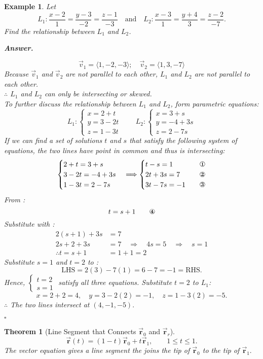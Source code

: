 \documentclass[12pt,a4paper]{article}
\newtheorem{thm}{Theorem}[subsection]
\newtheorem{eg}{Example}[subsection]
\newenvironment*{ans}{\par\indent\textbf{\textit{Answer. }}\par}{\par\hfill{$\square$}\par}
\def\vecv{\vec{v}}
\def\vecr{\vec{\boldsymbol{\textbf{r}}}}
\begin{document}
\begin{eg}
	Let \[L_1: \frac{x-2}{1}=\frac{y-3}{-2}=\frac{z-1}{-3}\quad\text{and}\quad L_2: \frac{x-3}{1}=\frac{y+4}{3}=\frac{z-2}{-7}.\] Find the relationship between $L_1$ and $L_2$.
	\begin{ans}
		\[\vecv_1=\langle1,-2,-3\rangle;\quad\vecv_2=\langle1,3,-7\rangle\]	 Because $\vecv_1$ and $\vecv_2$ are not parallel to each other, $L_1$ and $L_2$ are not parallel to each other. \\
		$\therefore$ $L_1$ and $L_2$ can only be intersecting or skewed. \\ 
		To further discuss the relationship between $L_1$ and $L_2$, form parametric equations: 
		\[L_1: \begin{cases}x=2+t\\y=3-2t\\z=1-3t\end{cases}\qquad L_2: \begin{cases}x=3+s\\y=-4+3s\\z=2-7s\end{cases}\]
		If we can find a set of solutions $t$ and $s$ that satisfy the following system of equations, the two lines have point in common and thus is intersecting: \[\begin{cases}2+t=3+s\\3-2t=-4+3s\\1-3t=2-7s\end{cases}\Longrightarrow\begin{cases}t-s=1\quad&\text{\ding{172}}\\2t+3s=7\quad&\text{\ding{173}}\\3t-7s=-1\quad&\text{\ding{174}}\end{cases}\]
		From : \[t=s+1\qquad\text{\ding{175}}\]
		Substitute  with : $$\begin{aligned}
			2(s+1)+3s&=7\\
			2s+2+3s&=7\quad\Rightarrow\quad4s=5\quad\Rightarrow\quad s=1\\
			\therefore t=s+1&=1+1=2
		\end{aligned}$$
		Substitute $s=1$ and $t=2$ to : \[\text{LHS}=2(3)-7(1)=6-7=-1=\text{RHS}.\]
		Hence, $\begin{cases}t=2\\s=1\end{cases}$ satisfy all three equations. Substitute $t=2$ to $L_1$: \[x=2+2=4,\quad y=3-2(2)=-1,\quad z=1-3(2)=-5.\]
		$\therefore$ The two lines intersect at $(4,-1,-5).$
	\end{ans}
\end{eg}
\begin{thm}[Line Segment that Connects $\vecr_0$ and $\vecr_r$]
\[\vecr(t)=(1-t)\vecr_0+t\vecr_1,\qquad1\leq t\leq1.\] The vector equation gives a line segment the joins the tip of $\vecr_0$ to the tip of $\vecr_1.$
\end{thm}
\end{document}
